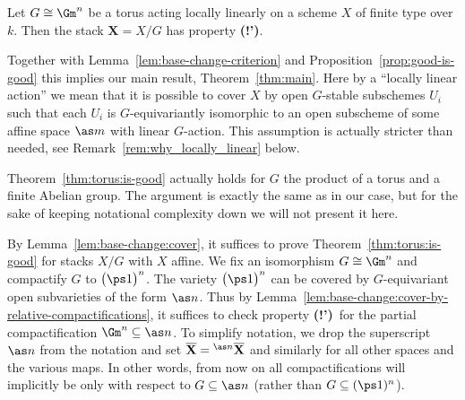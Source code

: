\documentclass[english]{ck-article}
\let\stack\mathbf
\let\bar\overline
\newcommand\goodnessb{property \textbf{(!')}}
\newcommand\isgoodb{has property \textbf{(!')}}
\begin{document}
\begin{Thm}
    \label{thm:torus:is-good}%
    Let $G \cong \Gm^n$ be a torus acting locally linearly on a scheme $X$ of finite type over $k$.
    Then the stack $\stack X = X/G$ \isgoodb.
\end{Thm}

Together with Lemma~\ref{lem:base-change-criterion} and Proposition~\ref{prop:good-is-good} this implies our main result, Theorem~\ref{thm:main}.
Here by a \enquote{locally linear action} we mean that it is possible to cover $X$ by open $G$-stable subschemes $U_i$ such that each $U_i$ is $G$-equivariantly isomorphic to an open subscheme of some affine space $\as m$ with linear $G$-action.
This assumption is actually stricter than needed, see Remark~\ref{rem:why_locally_linear} below.

\begin{Rem}
    Theorem~\ref{thm:torus:is-good} actually holds for $G$ the product of a torus and a finite Abelian group.
    The argument is exactly the same as in our case, but for the sake of keeping notational complexity down we will not present it here.
\end{Rem}

By Lemma~\ref{lem:base-change:cover}, it suffices to prove Theorem~\ref{thm:torus:is-good} for stacks $X/G$ with $X$ affine.
We fix an isomorphism $G \cong \Gm^n$ and compactify $G$ to $\bigl(\ps1\bigr)^n$.
The variety $\bigl(\ps1\bigr)^n$ can be covered by $G$-equivariant open subvarieties of the form $\as n$.
Thus by Lemma~\ref{lem:base-change:cover-by-relative-compactifications}, it suffices to check \goodnessb\ for the partial compactification $\Gm^n \subseteq \as n$.
To simplify notation, we drop the superscript $\as n$ from the notation and set $\bar{\stack X} = {}^{\as n}\bar{\stack X}$ and similarly for all other spaces and the various maps.
In other words, from now on all compactifications will implicitly be only with respect to $G \subseteq \as n$ (rather than $G \subseteq (\ps 1)^n$).
\end{document}
